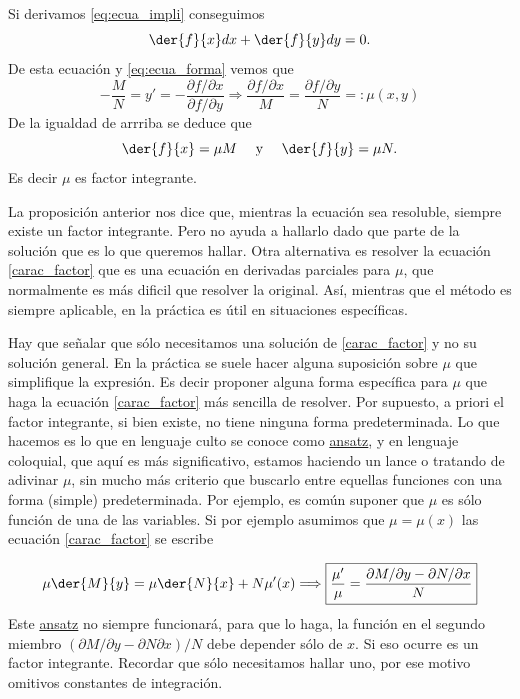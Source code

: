 \begin{demo} Si derivamos \eqref{eq:ecua_impli} conseguimos
\[\der{f}{x}dx+\der{f}{y}dy=0.\]
De esta ecuación y \eqref{eq:ecua_forma}  vemos que
\[-\frac{M}{N}=y'=-\frac{\partial f /\partial x}{\partial f/\partial y}\Longrightarrow \frac{ \partial f /\partial x}{M}=\frac{ \partial f/\partial y}{N}=:\mu(x,y)\]
 De la igualdad de arrriba se deduce que
\[\der{f}{x}=\mu M\quad\text{ y }\quad \der{f}{y}=\mu N.\]
Es decir $\mu$ es factor integrante.
\end{demo}

La proposición anterior nos dice que, mientras la ecuación sea resoluble, siempre  existe un factor integrante. Pero no ayuda a hallarlo dado que parte de la solución que es lo que queremos hallar. Otra alternativa es resolver la ecuación \eqref{carac_factor} que es una ecuación en derivadas parciales para $\mu$, que normalmente es más dificil que resolver  la original. Así, mientras que el método es siempre aplicable, en la práctica es útil en situaciones específicas.

Hay que señalar que sólo necesitamos una solución de \eqref{carac_factor} y no su solución general. En la práctica se suele hacer alguna suposición
sobre $\mu$ que simplifique la expresión. Es decir proponer alguna forma específica para $\mu$ que haga la ecuación \eqref{carac_factor} más sencilla de resolver. Por supuesto, a priori el factor integrante, si bien existe, no tiene ninguna forma predeterminada. Lo que hacemos es lo que en lenguaje culto se conoce como \href{http://es.wikipedia.org/wiki/Ansatz}{ansatz}\link, y en lenguaje coloquial, que aquí es más significativo, estamos haciendo un lance o tratando de adivinar $\mu$, sin mucho más criterio que buscarlo entre equellas funciones con una forma (simple) predeterminada. Por ejemplo, es común suponer que $\mu$ es sólo función de una de las variables. Si por ejemplo asumimos que $\mu=\mu(x)$ las ecuación
\eqref{carac_factor} se escribe

\[\mu\der{M}{y}=\mu\der{N}{x}+N\mu'(x) \Longrightarrow\boxed{\frac{\mu'}{\mu}=\frac{\partial M/\partial y-\partial N/\partial x}{N}}\]
Este \href{http://es.wikipedia.org/wiki/Ansatz}{ansatz} no siempre funcionará,
para que lo haga,  la función en el segundo miembro $(\partial M/\partial
y-\partial N\partial x)/N$
debe depender sólo de $x$. Si eso ocurre
es un factor integrante. Recordar que sólo necesitamos hallar uno, por ese motivo omitivos constantes de integración.

